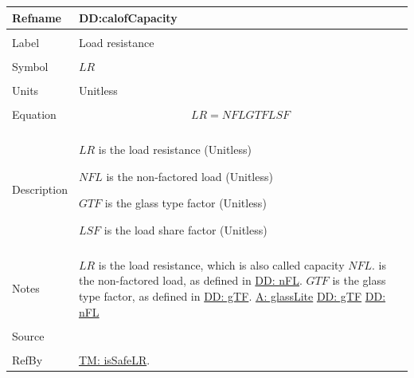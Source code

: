\documentclass[12pt]{article}
\begin{document}
\noindent \begin{minipage}{\textwidth}
\begin{tabular}{p{} p{}}
\toprule \textbf{Refname} & \textbf{DD:calofCapacity}
\label{DD:calofCapacity}
\\ \midrule \\
Label & Load resistance
\\ \midrule \\
Symbol & $LR$
\\ \midrule \\
Units & Unitless
\\ \midrule \\
Equation & \begin{dmath}
           LR=NFL GTF LSF
           \end{dmath}
\\ \midrule \\
Description & \begin{symbDescription}
              \item{$LR$ is the load resistance (Unitless)}
              \item{$NFL$ is the non-factored load (Unitless)}
              \item{$GTF$ is the glass type factor (Unitless)}
              \item{$LSF$ is the load share factor (Unitless)}
              \end{symbDescription}
\\ \midrule \\
Notes & $LR$ is the load resistance, which is also called capacity $NFL$. is the non-factored load, as defined in \hyperref[DD:nFL]{DD: nFL}. $GTF$ is the glass type factor, as defined in \hyperref[DD:gTF]{DD: gTF}.
        \hyperref[A:glassLite]{A: glassLite}
        \hyperref[DD:gTF]{DD: gTF}
        \hyperref[DD:nFL]{DD: nFL}
\\ \midrule \\
Source & \cite{astm2009}
\\ \midrule \\
RefBy & \hyperref[TM:isSafeLR]{TM: isSafeLR}.
\\ \bottomrule \end{tabular}
\end{minipage}\\
~\newline
\end{document}
